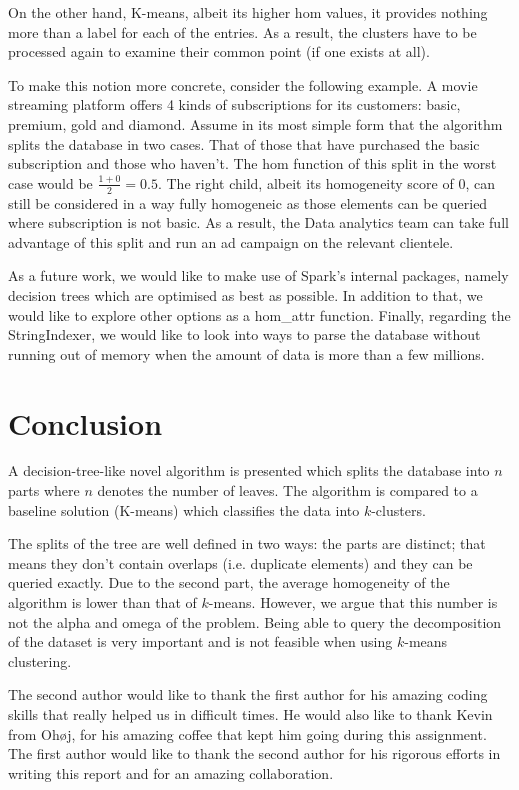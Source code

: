 \documentclass[sigconf]{acmart}
\begin{document}
On the other hand, K-means, albeit its higher hom values, it provides nothing more than a label for each of the entries. As a result, the clusters have to be processed again to examine their common point (if one exists at all).

To make this notion more concrete, consider the following example. A movie streaming platform offers 4 kinds of subscriptions for its customers: basic, premium, gold and diamond. Assume in its most simple form that the algorithm splits the database in two cases. That of those that have purchased the basic subscription and those who haven't. The hom function of this split in the worst case would be $\frac{1+0}{2} = 0.5$. The right child, albeit its homogeneity score of 0, can still be considered in a way fully homogeneic as those elements can be queried where subscription is not basic. As a result, the Data analytics team can take full advantage of this split and run an ad campaign on the relevant clientele.




As a future work, we would like to make use of Spark's internal packages, namely decision trees which are optimised as best as possible. In addition to that, we would like to explore other options as a hom\_attr function. Finally, regarding the StringIndexer, we would like to look into ways to parse the database without running out of memory when the amount of data is more than a few millions.

\section{Conclusion}
A decision-tree-like novel algorithm is presented which splits the database into $n$ parts where $n$ denotes the number of leaves. The algorithm is compared to a baseline solution (K-means) which classifies the data into $k$-clusters.

The splits of the tree are well defined in two ways: the parts are distinct; that means they don't contain overlaps (i.e. duplicate elements) and they can be queried exactly. Due to the second part, the average homogeneity of the algorithm is lower than that of $k$-means. However, we argue that this number is not the alpha and omega of the problem. Being able to query the decomposition of the dataset is very important and is not feasible when using $k$-means clustering.

\begin{acks}
The second author would like to thank the first author for his amazing coding skills that really helped us in difficult times. He would also like to thank Kevin from Oh{\o}j, for his amazing coffee that kept him going during this assignment. The first author would like to thank the second author for his rigorous efforts in writing this report and for an amazing collaboration.
\end{acks}
\end{document}
